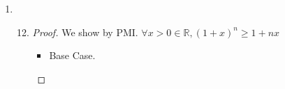 \documentclass[12pt,letterpaper]{article}
\begin{document}
\begin{enumerate}
\begin{enumerate}
\begin{enumerate}
\begin{proof}
\begin{itemize}
                    \begin{align*}
                      \prod\limits_{i = 1}^{n + 1}(2i - 1)
                      &= \prod\limits_{i = 1}^{n}(2i - 1) \cdot \left(2(n + 1) - 1\right) \\
                      &= \frac{\left(2n\right)!}{n! 2^n} \cdot \left(2(n + 1) - 1\right) \\
                      &= \frac{\left(2n\right)!}{n! 2^n} \cdot \left(2n + 2 - 1\right) \\
                      &= \frac{\left(2n\right)!}{n! 2^n} \cdot \left(2n + 1\right) \\
                      &= \frac{\left(2n + 1\right)!}{n! 2^n} \\
                      &= \frac{\left(2n + 1\right)!}{n! 2^n} \cdot \frac{2n + 2}{2n + 2} \\
                      &= \frac{\left(2n + 2\right)!}{n! 2^n \left(2n + 2\right)} \\
                      &= \frac{\left(2n + 2\right)!}{n! 2^n \left(2\left(n + 1\right)\right)} \\
                      &= \frac{\left(2n + 2\right)!}{n! 2^{n + 1} \left(n + 1\right)} \\
                      &= \frac{\left(2n + 2\right)!}{\left(n + 1\right)! 2^{n + 1}} \\
                      &= \frac{\left(2\left(n + 1\right)\right)!}{\left(n + 1\right)! 2^{n + 1}} \\
                    \end{align*}

                  \item
                    From the Base case and the inductive case,
                    we use the PMI to state $\prod\limits_{i = 1}^{n}(2i - 1) = \frac{\left(2n\right)!}{n! 2^n}, \forall n \in \mathbb{N}$
                \end{itemize}
              \end{proof}
          \end{enumerate}
        \item
          \begin{enumerate}
            \setcounter{enumiii}{11}
            \item
              \begin{proof}
                We show by PMI.
                $\forall x > 0 \in \mathbb{R}, \left(1 + x\right)^n \geq 1 + nx$
                \begin{itemize}
                  \item Base Case.


\end{itemize}
\end{proof}
\end{enumerate}
\end{enumerate}
\end{enumerate}
\end{document}
